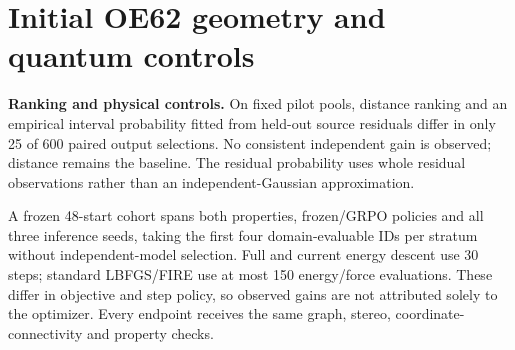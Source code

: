 \documentclass[11pt,a4paper]{article}
\begin{document}
\section{Initial OE62 geometry and quantum
controls}\label{initial-oe62-geometry-and-quantum-controls}

\textbf{Ranking and physical controls.} On fixed pilot pools, distance
ranking and an empirical interval probability fitted from held-out
source residuals differ in only 25 of 600 paired output selections. No
consistent independent gain is observed; distance remains the baseline.
The residual probability uses whole residual observations rather than an
independent-Gaussian approximation.

A frozen 48-start cohort spans both properties, frozen/GRPO policies and
all three inference seeds, taking the first four domain-evaluable IDs
per stratum without independent-model selection. Full and current energy
descent use 30 steps; standard LBFGS/FIRE use at most 150 energy/force
evaluations. These differ in objective and step policy, so observed
gains are not attributed solely to the optimizer. Every endpoint
receives the same graph, stereo, coordinate-connectivity and property
checks.
\end{document}
